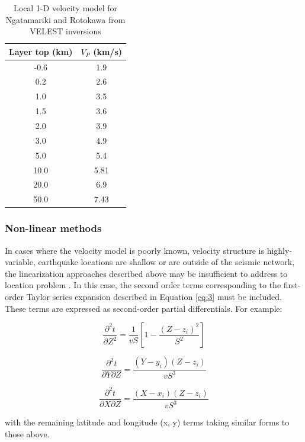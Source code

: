 \begin{table}
\centering
\begin{tabular}{cc}
    {Layer top (km)} & {$V_{P}$ (km/s)} \\ \midrule
    -0.6  & 1.9 \\
    0.2  & 2.6  \\
    1.0  & 3.5  \\
    1.5  & 3.6  \\
    2.0  & 3.9   \\
    3.0  & 4.9  \\
    5.0  & 5.4  \\
    10.0  & 5.81  \\
    20.0  & 6.9  \\
    50.0 & 7.43   \\
\end{tabular}
\caption{{Local 1-D velocity model for Ngatamariki and Rotokawa from VELEST inversions}}
\label{vmod}
\end{table}

\subsubsection{Non-linear methods}
In cases where the velocity model is poorly known, velocity structure is highly-variable, earthquake locations are shallow or are outside of the seismic network, the linearization approaches described above may be insufficient to address to location problem \citep{thurber1985nonlinear}. In this case, the second order terms corresponding to the first-order Taylor series expansion described in Equation \ref{eq:3} must be included. These terms are expressed as second-order partial differentials. For example:

\begin{equation}
\frac{\partial^{2}{t}}{\partial{Z}^{2}} = \frac{1}{vS}\left[1 - \frac{(Z - z_{i})^{2}}{S^2}\right]
\end{equation}

\begin{equation}
\frac{\partial^{2}t}{\partial{Y}\partial{Z}} = \frac{(Y - y_i)(Z - z_i)}{vS^3}
\end{equation}

\begin{equation}
\frac{\partial^{2}t}{\partial{X}\partial{Z}} = \frac{(X - x_i)(Z - z_i)}{vS^3}
\end{equation}

with the remaining latitude and longitude (x, y) terms taking similar forms to those above.

